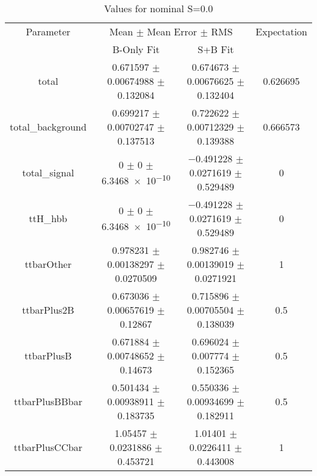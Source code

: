 \begin{table}
\centering
\caption{Values for nominal S=0.0}
\begin{tabular}{cccc}
\toprule
Parameter & \multicolumn{2}{c}{Mean $\pm$ Mean Error $\pm$ RMS} & Expectation\\
 & B-Only Fit & S+B Fit & \\
\midrule
total & \num{0.671597} $\pm$ \num{0.00674988} $\pm$ \num{0.132084} & \num{0.674673} $\pm$ \num{0.00676625} $\pm$ \num{0.132404} & \num{0.626695}\\
total\_background & \num{0.699217} $\pm$ \num{0.00702747} $\pm$ \num{0.137513} & \num{0.722622} $\pm$ \num{0.00712329} $\pm$ \num{0.139388} & \num{0.666573}\\
total\_signal & \num{0} $\pm$ \num{0} $\pm$ \num{6.3468e-10} & \num{-0.491228} $\pm$ \num{0.0271619} $\pm$ \num{0.529489} & \num{0}\\
ttH\_hbb & \num{0} $\pm$ \num{0} $\pm$ \num{6.3468e-10} & \num{-0.491228} $\pm$ \num{0.0271619} $\pm$ \num{0.529489} & \num{0}\\
ttbarOther & \num{0.978231} $\pm$ \num{0.00138297} $\pm$ \num{0.0270509} & \num{0.982746} $\pm$ \num{0.00139019} $\pm$ \num{0.0271921} & \num{1}\\
ttbarPlus2B & \num{0.673036} $\pm$ \num{0.00657619} $\pm$ \num{0.12867} & \num{0.715896} $\pm$ \num{0.00705504} $\pm$ \num{0.138039} & \num{0.5}\\
ttbarPlusB & \num{0.671884} $\pm$ \num{0.00748652} $\pm$ \num{0.14673} & \num{0.696024} $\pm$ \num{0.007774} $\pm$ \num{0.152365} & \num{0.5}\\
ttbarPlusBBbar & \num{0.501434} $\pm$ \num{0.00938911} $\pm$ \num{0.183735} & \num{0.550336} $\pm$ \num{0.00934699} $\pm$ \num{0.182911} & \num{0.5}\\
ttbarPlusCCbar & \num{1.05457} $\pm$ \num{0.0231886} $\pm$ \num{0.453721} & \num{1.01401} $\pm$ \num{0.0226411} $\pm$ \num{0.443008} & \num{1}\\
\bottomrule
\end{tabular}
\end{table}